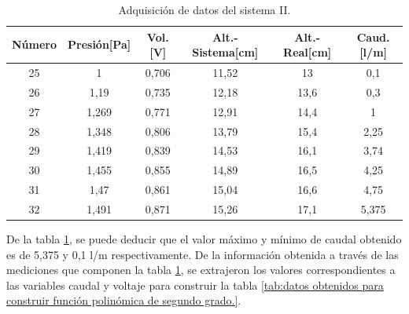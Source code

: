 \begin{table}[htpb]
	\centering
	\caption[Adquisición de datos del sistema II]{Adquisición de datos del sistema II.}
	\begin{tabular}{c c c c c c}    
		\toprule
		\textbf{Número}   & \textbf{Presión[Pa]}  & \textbf{Vol.[V]} & \textbf{Alt.-Sistema[cm]} & \textbf{Alt.-Real[cm]} & \textbf{Caud.[l/m]} \\
		\midrule
		25  & 1     & 0,706  & 11,52  & 13   &  0,1\\
		26  & 1,19  & 0,735  & 12,18  & 13,6 &  0,3\\
		27  & 1,269 & 0,771  & 12,91  & 14,4 &  1 \\
		28  & 1,348 & 0,806  & 13,79  & 15,4 &  2,25 \\
		29  & 1,419 & 0,839	 & 14,53  & 16,1 &  3,74\\
		30  & 1,455 & 0,855  & 14,89  & 16,5 &  4,25\\
		31  & 1,47  & 0,861	 & 15,04  & 16,6 &  4,75\\
		32  & 1,491 & 0,871	 & 15,26  & 17,1 &  5,375\\
		
		\bottomrule
		\hline
	\end{tabular}
	\label{tab:adquisición de datos del sistema II.}
\end{table}


De la tabla \ref{tab:adquisición de datos del sistema II.}, se puede deducir que el valor máximo y mínimo de caudal obtenido es de 5,375 y 0,1 l/m respectivamente.
De la información obtenida a través de las mediciones que componen la tabla \ref{tab:adquisición de datos del sistema II.}, se extrajeron los valores correspondientes a las variables caudal y voltaje para construir la tabla \ref{tab:datos obtenidos para construir función polinómica de segundo grado.}.

